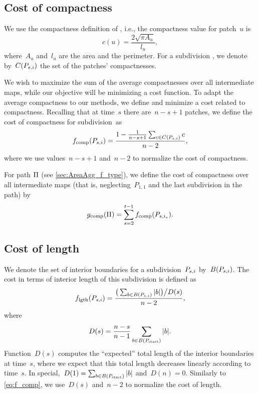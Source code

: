 \subsection{Cost of compactness}
\label{sec:AreaAgg_f_comp}

We use the compactness definition of \citet{Frolov1975}, 
i.e., the compactness value for patch~$u$ is
\begin{equation*}
\label{eq:comp}
c(u)=\frac{2 \sqrt{\pi A_u}}{l_u},
\end{equation*}
where~$A_u$ and~$l_u$ are 
the area and the perimeter. 
For a subdivision \Psnode, we denote by~$C(P_{s,i})$ 
the set of the patches' compactnesses.

We wish to maximize the sum of the average compactnesses 
over all intermediate maps,
while our objective will be
minimizing a cost function.
To adapt the average compactness to our methods, 
we define and minimize a cost related to compactness.
Recalling that at time~$s$ there are~$n-s+1$ patches,
we define the cost of compactness for subdivision~\Psnode as
\begin{equation}
\label{eq:f_comp}
f_{\mathrm{comp}}(P_{s,i})=
\frac{1-\frac{1}{n-s+1} \sum_{c\in C(P_{s,i})}c}{n-2},
\end{equation}
where we use values~$n-s+1$ and~$n-2$ to normalize 
the cost of compactness.

For path $\Pi$ (see \sect\ref{sec:AreaAgg_f_type}),  
we define the cost of compactness over all 
intermediate maps
(that is, neglecting~$P_{1,1}$ 
and the last subdivision in the path) by
\begin{equation}
\label{eq:g_comp}
g_\mathrm{comp}(\Pi)=
\sum_{s=2}^{t-1}f_{\mathrm{comp}}(P_{s,i_s}).
\end{equation}


\subsection{Cost of length}
\label{sec:AreaAgg_costlength}

We denote the set of interior boundaries 
for a subdivision~$P_{s,i}$ by~$B(P_{s,i})$.
The cost in terms of interior length of 
this subdivision is defined as
\begin{equation}
\label{eq:f_length}
f_{\mathrm{lgth}}(P_{s,i})=
\frac{\big(\sum_{b\in B (P_{s,i})} 
	|b|\big)\big/D(s)}{n-2}, 
\end{equation} 
where 
\begin{equation}
\label{eq:AreaAgg_Norm}
D(s)=\frac{n-s}{n-1} \sum_{b\in B (P_\mathrm{start})} |b|.
\end{equation}
Function~$D(s)$ computes the ``expected'' total length of 
the interior boundaries at time~$s$,
where we expect that this total length decreases linearly
according to time~$s$.
In special,~$D(1) = \sum_{b\in B (P_\mathrm{start})} |b|$
and~$D(n) = 0$.
Similarly to \eq\ref{eq:f_comp}, 
we use~$D(s)$ and~$n-2$ to normalize 
the cost of length.


